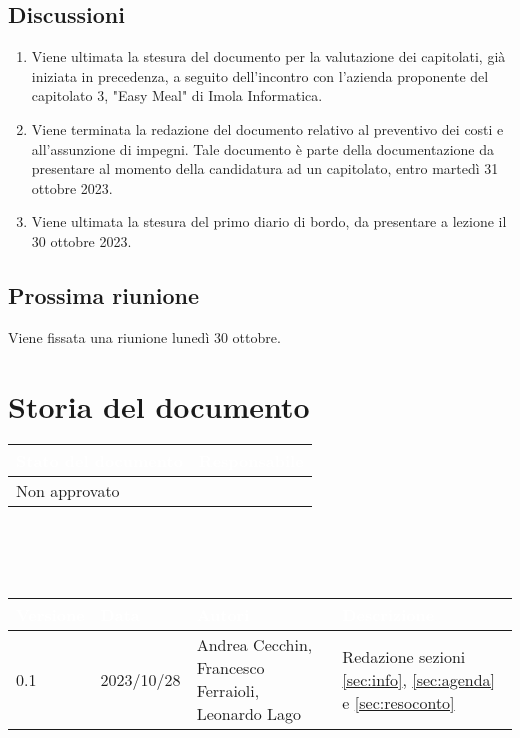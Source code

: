 \documentclass[12pt]{article}
\begin{document}
\subsection{Discussioni} \label{subsec:resdiscussione}
\begin{enumerate}
    \item Viene ultimata la stesura del documento per la valutazione dei capitolati, già iniziata in precedenza, a seguito dell'incontro con l'azienda proponente del capitolato 3, "Easy Meal" di Imola Informatica.
    \item Viene terminata la redazione del documento relativo al preventivo dei costi e all'assunzione di impegni. Tale documento è parte della documentazione da presentare al momento della candidatura ad un capitolato, entro martedì 31 ottobre 2023.
    \item Viene ultimata la stesura del primo diario di bordo, da presentare a lezione il 30 ottobre 2023.
    
\end{enumerate}

\subsection{Prossima riunione} \label{subsec:riunione}
Viene fissata una riunione lunedì 30 ottobre.

\section{Storia del documento} \label{sec:storia}
\begingroup
\setlength{\tabcolsep}{10pt}
\renewcommand{\arraystretch}{1.5}
\begin{tabularx}{\textwidth}{| X | X |}
    \hline
    \rowcolor{headerrow} \textbf{\textcolor{white}{Stato del documento}} & \textbf{\textcolor{white}{Responsabile}} \\
    \hline
    Non approvato &\\
    \hline   
\end{tabularx}
\\\\\\
\begingroup
\setlength{\tabcolsep}{10pt}
\renewcommand{\arraystretch}{1.5}
\begin{tabularx}{\textwidth}{| l | l | X | X |}
    \hline
    \rowcolor{headerrow} \textbf{\textcolor{white}{Versione}} & \textbf{\textcolor{white}{Data}} & \textbf{\textcolor{white}{Autori}} & \textbf{\textcolor{white}{Descrizione}} \\
     \hline
    0.1 & 2023/10/28 & Andrea Cecchin, Francesco Ferraioli, Leonardo Lago & Redazione sezioni \ref{sec:info}, \ref{sec:agenda} e \ref{sec:resoconto}\\
    \hline
\end{tabularx}
\endgroup
\end{document}
